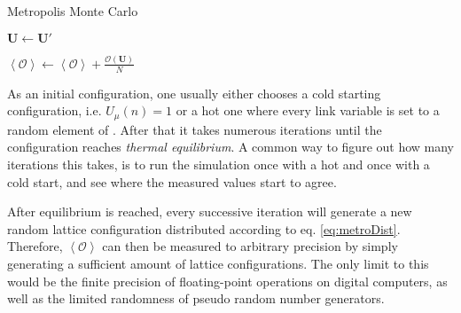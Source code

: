 \begin{algorithm}[!htb]
 \caption{Metropolis Monte Carlo}
 \label{alg:metroMonte}
 \begin{algorithmic}[1]
  \STATE {}

  \STATE {}
  \STATE {}
  \label{code:metroMonteIfCond}
  \STATE {}
  \STATE $\boldsymbol{U} \leftarrow \boldsymbol{U}'$
  \ENDIF

  \ENDFOR
  \STATE $\left\langle \mathcal{O} \right\rangle \leftarrow \left\langle \mathcal{O} \right\rangle + \frac{\mathcal{O}(\boldsymbol{U})}{N} $
  \ENDFOR
 \end{algorithmic}
\end{algorithm}
As an initial configuration, one usually either chooses a cold starting configuration, i.e. {$U_\mu(n)=1$} or a hot one where every link variable is set to a random element of \SUTwo. After that it takes numerous iterations until the configuration reaches \emph{thermal equilibrium}. A common way to figure out how many iterations this takes, is to run the simulation once with a hot and once with a cold start, and see where the measured values start to agree.

After equilibrium is reached, every successive iteration will generate a new random lattice configuration distributed according to eq. \ref{eq:metroDist}. Therefore, $\left\langle \mathcal{O} \right\rangle$ can then be measured to arbitrary precision by simply generating a sufficient amount of lattice configurations. The only limit to this would be the finite precision of floating-point operations on digital computers, as well as the limited randomness of pseudo random number generators.

